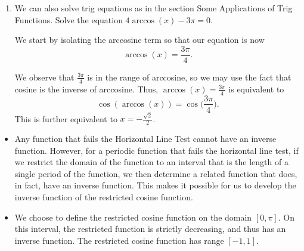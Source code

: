 \documentclass{ximera}
\begin{document}
\begin{example}
\begin{enumerate}
\begin{explanation}
\end{explanation}

\item We can also solve trig equations as in the section Some Applications of Trig Functions. Solve the equation $4\arccos(x)-3\pi=0$.

\begin{explanation}
We start by isolating the arccosine term so that our equation is now
$$\arccos(x) = \frac{3\pi}{4}.$$

We observe that $\frac{3\pi}{4}$ is in the range of arccosine, so we may use the fact that cosine is the inverse of arccosine. Thus, $\arccos(x) = \frac{3\pi}{4}$ is equivalent to 
$$\cos(\arccos(x)) = \cos\bigg(\frac{3\pi}{4}\bigg).$$
%
This is further equivalent to $x = -\frac{\sqrt{2}}{2}$.
\end{explanation}
%
\end{enumerate}
\end{example}



%


\begin{summary}
  \begin{itemize}
\item Any function that fails the Horizontal Line Test cannot have an inverse function.  However, for a periodic function that fails the horizontal line test, if we restrict the domain of the function to an interval that is the length of a single period of the function, we then determine a related function that does, in fact, have an inverse function.  This makes it possible for us to develop the inverse function of the restricted cosine function.
\item We choose to define the restricted cosine function on the domain $[0,\pi]$. On this interval, the restricted function is strictly decreasing, and thus has an inverse function.  The restricted cosine function has range $[-1,1]$. 
  \end{itemize}
\end{summary}
\end{document}
